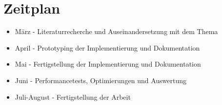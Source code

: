 \section{Zeitplan}

\begin{itemize}
\item März - Literaturrecherche und Auseinandersetzung mit dem Thema
\item April - Prototyping der Implementierung und Dokumentation
\item Mai - Fertigstellung der Implementierung und Dokumentation
\item Juni - Performancetests, Optimierungen und Auswertung
\item Juli-August - Fertigstellung der Arbeit
\end{itemize}